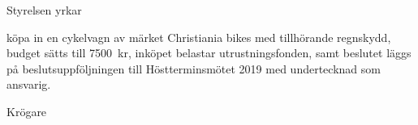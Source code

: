 \documentclass[../_main/handlingar.tex]{subfiles}
\begin{document}
Styrelsen yrkar

\begin{attsatser}
    \att köpa in en cykelvagn av märket Christiania bikes med tillhörande regnskydd,
    \att budget sätts till \SI{7500}{kr}, 
    \att inköpet belastar utrustningsfonden, samt
    \att beslutet läggs på beslutsuppföljningen till Höstterminsmötet 2019 med undertecknad som ansvarig.
  
\end{attsatser}

\begin{signatures}{1}
    \ist
    \signature{\krog}{Krögare}
    
\end{signatures}
\end{document}
